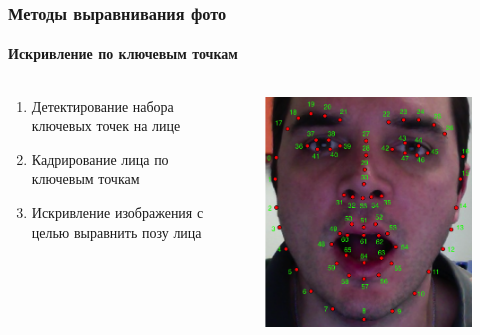 \documentclass{beamer}
\begin{document}
  \begin{frame}
  	  \frametitle{Методы выравнивания фото}
   	  \framesubtitle{Искривление по ключевым точкам}
   	  \begin{columns}
	  	\begin{column}{0.5\textwidth}
	  		\begin{enumerate}
				\item Детектирование набора ключевых точек на лице
				\item Кадрирование лица по ключевым точкам
				\item Искривление изображения с целью выравнить позу лица
   	  		\end{enumerate}
	  	\end{column}   	  
   	  	\begin{column}{0.5\textwidth}
   	  		\begin{figure}
   	  			\includegraphics[width=\textwidth]{avatar-annotation.png}
   	    		\end{figure}
   	  	\end{column}
   	  \end{columns}
  \end{frame}
  
\end{document}
